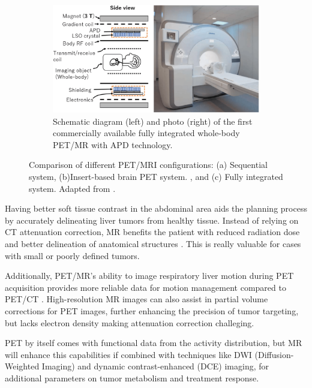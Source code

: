 \documentclass[11pt]{article} %
\begin{document}
\begin{multicols}{2}
\begin{figure}[H]
	\begin{subfigure}[b]{0.45\textwidth}
		\centering
		\includegraphics[width=\textwidth]{assets/integrated.png}
		\caption{Schematic diagram (left) and photo (right) of the first commercially available fully integrated whole-body PET/MR with APD technology.}
		\label{fig:integrated}
	\end{subfigure}
	
	\caption{Comparison of different PET/MRI configurations: (a) Sequential system, (b)Insert-based brain PET system. , and (c) Fully integrated system. Adapted from \cite{Kang2021}.}
	\label{fig:pet_mri_configurations}
\end{figure}
	

Having better soft tissue contrast in the abdominal area aids the planning process by accurately delineating liver tumors from healthy tissue. Instead of relying on CT attenuation correction, MR benefits the patient with reduced radiation dose and better delineation of anatomical structures \cite{knesaurek2018}. This is really valuable for cases with small or poorly defined tumors.

Additionally, PET/MR’s ability to image respiratory liver motion during PET acquisition provides more reliable data for motion management compared to PET/CT \cite{knesaurek2018}. High-resolution MR images can also assist in partial volume corrections for PET images, further enhancing the precision of tumor targeting, but lacks electron density making attenuation correction challeging.

PET by itself comes with functional data from the activity distribution, but MR will enhance this capabilities if combined with techniques like DWI (Diffusion-Weighted Imaging) and dynamic contrast-enhanced (DCE) imaging, for additional parameters on tumor metabolism and treatment response. 
 

\end{multicols}
\end{document}
